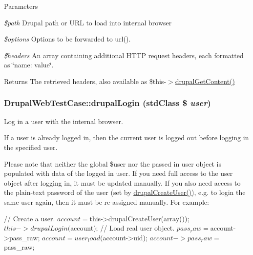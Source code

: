 \begin{DoxyParams}{Parameters}
\item[{\em \$path}]Drupal path or URL to load into internal browser \item[{\em \$options}]Options to be forwarded to url(). \item[{\em \$headers}]An array containing additional HTTP request headers, each formatted as \char`\"{}name: value\char`\"{}. \end{DoxyParams}
\begin{DoxyReturn}{Returns}
The retrieved headers, also available as \$this-\/$>$\hyperlink{class_drupal_web_test_case_a65cc4334da96452d127a9fb50636e7bb}{drupalGetContent()} 
\end{DoxyReturn}
\hypertarget{class_drupal_web_test_case_adb24a311afdca9c565f3556fafb8044f}{
\subsubsection[{drupalLogin}]{\setlength{\rightskip}{0pt plus 5cm}DrupalWebTestCase::drupalLogin (stdClass \$ {\em user})}}
\label{class_drupal_web_test_case_adb24a311afdca9c565f3556fafb8044f}
Log in a user with the internal browser.

If a user is already logged in, then the current user is logged out before logging in the specified user.

Please note that neither the global \$user nor the passed in user object is populated with data of the logged in user. If you need full access to the user object after logging in, it must be updated manually. If you also need access to the plain-\/text password of the user (set by \hyperlink{class_drupal_web_test_case_ad39222df2e8243c419d465bbe48b0713}{drupalCreateUser()}), e.g. to login the same user again, then it must be re-\/assigned manually. For example: 
\begin{DoxyCode}
   // Create a user.
   $account = $this->drupalCreateUser(array());
   $this->drupalLogin($account);
   // Load real user object.
   $pass_raw = $account->pass_raw;
   $account = user_load($account->uid);
   $account->pass_raw = $pass_raw;
\end{DoxyCode}



